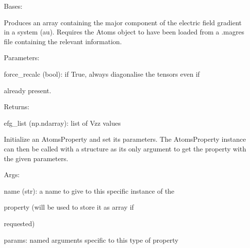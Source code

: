 \documentclass[letterpaper,10pt,english]{sphinxmanual}
\begin{document}
\begin{fulllineitems}
\label{doctree/soprano.properties.nmr.efg:soprano.properties.nmr.efg.EFGVzz}
Bases: {\hyperref[doctree/soprano.properties.atomsproperty:soprano.properties.atomsproperty.AtomsProperty]{\emph{}}}

Produces an array containing the major component of the electric field
gradient in a system (au).
Requires the Atoms object to have been loaded from a .magres file
containing the relevant information.

\begin{DUlineblock}{0em}
\item[] Parameters:
\item[]
\begin{DUlineblock}{\DUlineblockindent}
\item[] force\_recalc (bool): if True, always diagonalise the tensors even if
\item[]
\begin{DUlineblock}{\DUlineblockindent}
\item[] already present.
\end{DUlineblock}
\end{DUlineblock}
\end{DUlineblock}

\begin{DUlineblock}{0em}
\item[] Returns:
\item[]
\begin{DUlineblock}{\DUlineblockindent}
\item[] efg\_list (np.ndarray): list of Vzz values
\end{DUlineblock}
\end{DUlineblock}

Initialize an AtomsProperty and set its parameters.
The AtomsProperty instance can then be called with a structure as its
only argument to get the property with the given parameters.

\begin{DUlineblock}{0em}
\item[] Args:
\item[]
\begin{DUlineblock}{\DUlineblockindent}
\item[] name (str): a name to give to this specific instance of the
\item[]
\begin{DUlineblock}{\DUlineblockindent}
\item[] property (will be used to store it as array if
\item[] requested)
\end{DUlineblock}
\item[] params: named arguments specific to this type of property
\end{DUlineblock}
\end{DUlineblock}


\end{fulllineitems}
\end{document}
